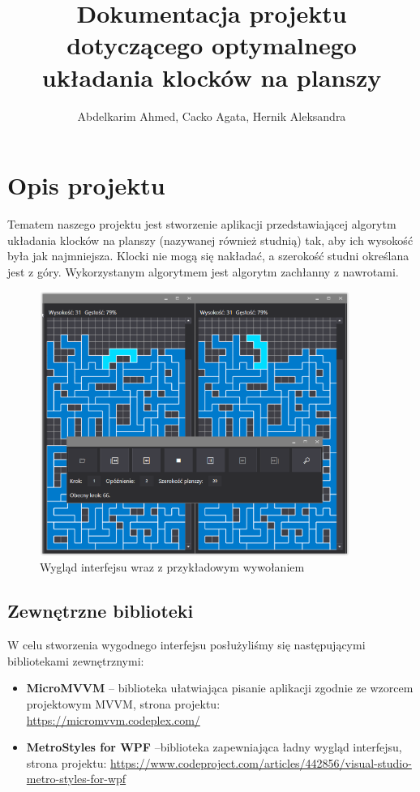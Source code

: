 \documentclass{article}
\title{Dokumentacja projektu dotyczącego optymalnego układania klocków na planszy}
\author{Abdelkarim Ahmed, Cacko Agata, Hernik Aleksandra}
\begin{document}
\maketitle
\section{Opis projektu}
Tematem naszego projektu jest stworzenie aplikacji przedstawiającej algorytm układania klocków na planszy (nazywanej również studnią) tak, aby ich wysokość była jak najmniejsza. Klocki nie mogą się nakładać, a szerokość studni określana jest z góry. Wykorzystanym algorytmem jest algorytm zachłanny z nawrotami.



\begin{figure}[H]
\begin{center}
\includegraphics[width=0.9\textwidth]{interfejs.png}
\end{center}
\vspace{-0.3cm}
\caption{Wygląd interfejsu wraz z przykładowym wywołaniem}
\end{figure}



\subsection{Zewnętrzne biblioteki}

W celu stworzenia wygodnego interfejsu posłużyliśmy się następującymi bibliotekami zewnętrznymi:


\begin{itemize}
\item \textbf{MicroMVVM} -- biblioteka ułatwiająca pisanie aplikacji zgodnie ze wzorcem projektowym MVVM, strona projektu: \\ \url{https://micromvvm.codeplex.com/}
\item \textbf{MetroStyles for WPF} --biblioteka zapewniająca ładny wygląd interfejsu, strona projektu: \url{https://www.codeproject.com/articles/442856/visual-studio-metro-styles-for-wpf}
\end{itemize}
\end{document}
